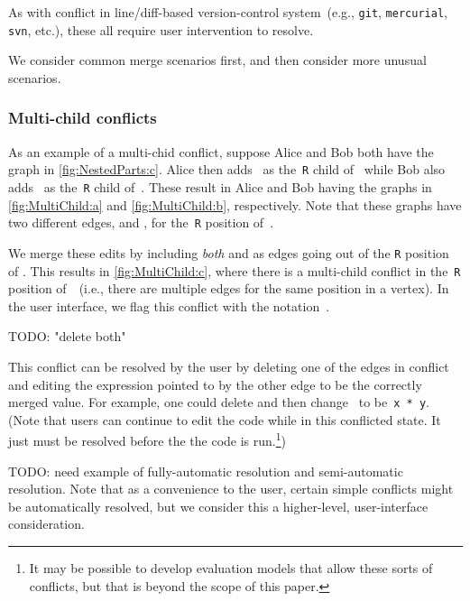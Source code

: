 As with conflict in line/diff-based version-control
system~(e.g., \texttt{git}, \texttt{mercurial}, \texttt{svn}, etc.),
these all require user intervention to resolve.

We consider common merge scenarios first, and then consider more unusual scenarios.

\subsubsection{Multi-child conflicts}%
\label{sub:Multi-child conflicts}

\figureMultiChild{}

As an example of a multi-chid conflict, suppose Alice and Bob both have the graph in \autoref{fig:NestedParts:c}.
Alice then adds~\vMultiChildAlice{} as the~\texttt{R} child of~\vWrapPlus{}
while Bob also adds~\vMultiChildBob{} as the~\texttt{R} child of~\vWrapPlus{}.
These result in Alice and Bob having the graphs in \autoref{fig:MultiChild:a} and \autoref{fig:MultiChild:b}, respectively.
Note that these graphs have two different edges, \eMultiChildAlice{} and \eMultiChildBob{}, for the~\texttt{R} position of~\vWrapPlus{}.

We merge these edits by including \emph{both} \eMultiChildAlice{} and \eMultiChildBob{}
as edges going out of the \texttt{R} position of \vWrapPlus{}.
This results in \autoref{fig:MultiChild:c}, where there is a multi-child conflict
in the~\texttt{R} position of~\vWrapPlus~(i.e., there are multiple edges for the same position in a vertex).
In the user interface, we flag this conflict with the notation~.

TODO: "delete both"

This conflict can be resolved by the user by deleting
one of the edges in conflict and editing the expression pointed to by the other edge to be the correctly merged value.
For example, one could delete \eMultiChildBob{} and then change~\vMultiChildAlice{} to be~\texttt{x * y}.
(Note that users can continue to edit the code while in this conflicted state.
It just must be resolved before the the code is run.\footnote{It
  may be possible to develop evaluation models that allow these sorts of conflicts,
  but that is beyond the scope of this paper.})

TODO: need example of fully-automatic resolution and semi-automatic resolution.
Note that as a convenience to the user, certain simple
conflicts might be automatically resolved,
but we consider this a higher-level, user-interface consideration.

